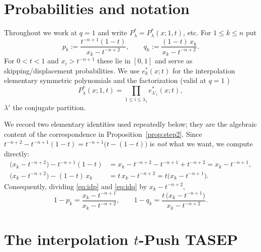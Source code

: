 \section*{Probabilities and notation}

Throughout we work at $q=1$ and write $P^*_\lambda=P^*_\lambda(x;1,t)$, etc.
For $1\le k\le n$ put
\[
p_k:=\frac{t^{-n+1}(1-t)}{x_k-t^{-n+2}},\qquad
q_k:=\frac{(1-t)\,x_k}{x_k-t^{-n+2}} .
\]
For $0<t<1$ and $x_i>t^{-n+1}$ these lie in $[0,1]$ and serve as
skipping/displacement probabilities. We use $e^*_k(x;t)$ for the interpolation
elementary symmetric polynomials and the factorization (valid at $q=1$
\cite{Dolega,BDW25a})
\begin{equation}\label{eq:factor}
P^*_\lambda(x;1,t)=\prod_{1\le i\le\lambda_1}e^*_{\lambda'_i}(x;t),
\end{equation}
$\lambda'$ the conjugate partition.

We record two elementary identities used repeatedly below; they are the
algebraic content of the correspondence in Proposition~\ref{prop:step2}. Since
$t^{-n+2}-t^{-n+1}(1-t)=t^{-n+1}\bigl(t-(1-t)\bigr)$ is \emph{not} what we want,
we compute directly:
\begin{align}
\bigl(x_k-t^{-n+2}\bigr)-t^{-n+1}(1-t)
   &=x_k-t^{-n+2}-t^{-n+1}+t^{-n+2}=x_k-t^{-n+1},
   \label{eq:idp}\\
\bigl(x_k-t^{-n+2}\bigr)-(1-t)\,x_k
   &=t\,x_k-t^{-n+2}=t\bigl(x_k-t^{-n+1}\bigr).
   \label{eq:idq}
\end{align}
Consequently, dividing \eqref{eq:idp} and \eqref{eq:idq} by $x_k-t^{-n+2}$,
\begin{equation}\label{eq:skipprobs}
1-p_k=\frac{x_k-t^{-n+1}}{x_k-t^{-n+2}},\qquad
1-q_k=\frac{t\,\bigl(x_k-t^{-n+1}\bigr)}{x_k-t^{-n+2}} .
\end{equation}

\section*{The interpolation $t$-Push TASEP}

